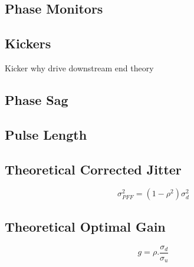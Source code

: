 \subsection{Phase Monitors}
\label{ss:phMons}

\subsection{Kickers}
\label{ss:kickers}

Kicker why drive downstream end theory



\subsection{Phase Sag}
\label{ss:phaseSag}

\subsection{Pulse Length}
\label{ss:pulseLength}


\subsection{Theoretical Corrected Jitter}
\label{ss:theoryJitter}

\begin{equation}
\sigma_{PFF}^2 = (1-\rho^2)\sigma_d^2
\label{e:theoretJitOptGain}
\end{equation}

\subsection{Theoretical Optimal Gain}
\label{ss:theoryGain}

\begin{equation}
g = \rho . \frac{\sigma_{d}}{\sigma_{u}}
\label{e:theoretOptGain}
\end{equation}
